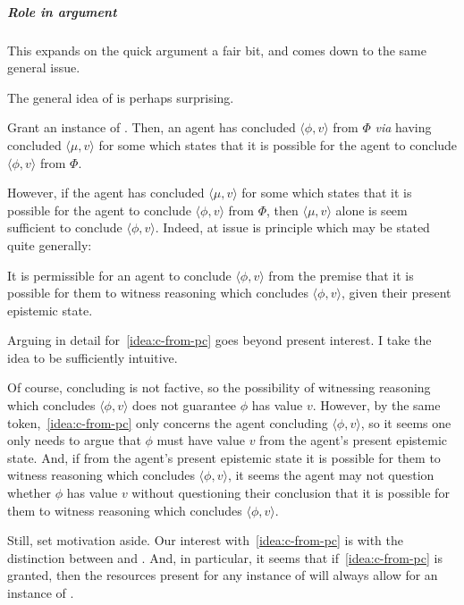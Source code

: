 \subparagraph*{Role in argument}

\begin{note}
  \color{red}
  This expands on the quick argument a fair bit, and comes down to the same general issue.
\end{note}

\begin{note}
  The general idea of \adB{} is perhaps surprising.

  Grant an instance of \adB{}.
  Then, an agent has concluded \(\langle \phi,v \rangle\) from \(\Phi\) \emph{via} having concluded \(\langle \mu,v \rangle\) for some  which states that it is possible for the agent to conclude \(\langle \phi,v \rangle\) from \(\Phi\).

  However, if the agent has concluded \(\langle \mu,v \rangle\) for some  which states that it is possible for the agent to conclude \(\langle \phi,v \rangle\) from \(\Phi\), then \(\langle \mu,v \rangle\) alone is seem sufficient to conclude \(\langle \phi,v \rangle\).
  Indeed, at issue is principle which may be stated quite generally:

  \begin{idea}
    \label{idea:c-from-pc}
    It is permissible for an agent to conclude \(\langle \phi,v \rangle\) from the premise that it is possible for them to witness reasoning which concludes \(\langle \phi,v \rangle\), given their present epistemic state.
  \end{idea}

  Arguing in detail for~\autoref{idea:c-from-pc} goes beyond present interest.
  I take the idea to be sufficiently intuitive.

  Of course, concluding is not factive, so the possibility of witnessing reasoning which concludes \(\langle \phi,v \rangle\) does not guarantee \(\phi\) has value \(v\).
  However, by the same token,~\autoref{idea:c-from-pc} only concerns the agent concluding \(\langle \phi,v \rangle\), so it seems one only needs to argue that \(\phi\) must have value \(v\) from the agent's present epistemic state.
  And, if from the agent's present epistemic state it is possible for them to witness reasoning which concludes \(\langle \phi,v \rangle\), it seems the agent may not question whether \(\phi\) has value \(v\) without questioning their conclusion that it is possible for them to witness reasoning which concludes \(\langle \phi,v \rangle\).

  Still, set motivation aside.
  Our interest with~\autoref{idea:c-from-pc} is with the distinction between \adA{} and \adB{}.
  And, in particular, it seems that if~\autoref{idea:c-from-pc} is granted, then the resources present for any instance of \adB{} will always allow for an instance of \adA{}.


\end{note}
